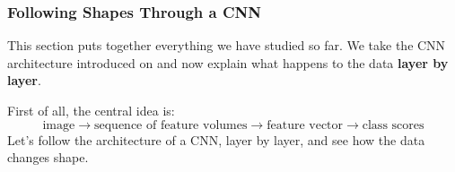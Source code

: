 \subsubsection{Following Shapes Through a CNN}\label{sec:following-shapes-through-a-cnn}

This section puts together everything we have studied so far. We take the CNN architecture introduced on  and now explain what happens to the data \textbf{layer by layer}.

\highspace
First of all, the central idea is:
\begin{equation*}
    \text{image} \to \text{sequence of feature volumes} \to \text{feature vector} \to \text{class scores}
\end{equation*}
Let's follow the architecture of a CNN, layer by layer, and see how the data changes shape.
